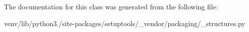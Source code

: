 The documentation for this class was generated from the following file\+:\begin{DoxyCompactItemize}
\item 
venv/lib/python3./site-\/packages/setuptools/\+\_\+vendor/packaging/\+\_\+structures.\+py\end{DoxyCompactItemize}
